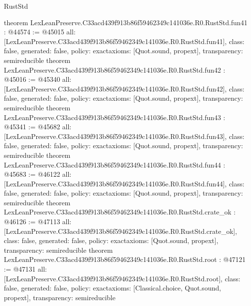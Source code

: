 \begin{lexlean}{RustStd}
\begin{coremodule}
{}
theorem LexLeanPreserve.C33acd439f913b86f59462349c141036e.R0.RustStd.fun41 : @44574 := @45015 {
  all: [LexLeanPreserve.C33acd439f913b86f59462349c141036e.R0.RustStd.fun41],
  class: false,
  generated: false,
  policy: exact{axioms: [Quot.sound, propext]},
  transparency: semireducible
}
theorem LexLeanPreserve.C33acd439f913b86f59462349c141036e.R0.RustStd.fun42 : @45016 := @45340 {
  all: [LexLeanPreserve.C33acd439f913b86f59462349c141036e.R0.RustStd.fun42],
  class: false,
  generated: false,
  policy: exact{axioms: [Quot.sound, propext]},
  transparency: semireducible
}
theorem LexLeanPreserve.C33acd439f913b86f59462349c141036e.R0.RustStd.fun43 : @45341 := @45682 {
  all: [LexLeanPreserve.C33acd439f913b86f59462349c141036e.R0.RustStd.fun43],
  class: false,
  generated: false,
  policy: exact{axioms: [Quot.sound, propext]},
  transparency: semireducible
}
theorem LexLeanPreserve.C33acd439f913b86f59462349c141036e.R0.RustStd.fun44 : @45683 := @46122 {
  all: [LexLeanPreserve.C33acd439f913b86f59462349c141036e.R0.RustStd.fun44],
  class: false,
  generated: false,
  policy: exact{axioms: [Quot.sound, propext]},
  transparency: semireducible
}
theorem LexLeanPreserve.C33acd439f913b86f59462349c141036e.R0.RustStd.crate_ok : @46126 := @47113 {
  all: [LexLeanPreserve.C33acd439f913b86f59462349c141036e.R0.RustStd.crate_ok],
  class: false,
  generated: false,
  policy: exact{axioms: [Quot.sound, propext]},
  transparency: semireducible
}
theorem LexLeanPreserve.C33acd439f913b86f59462349c141036e.R0.RustStd.root : @47121 := @47131 {
  all: [LexLeanPreserve.C33acd439f913b86f59462349c141036e.R0.RustStd.root],
  class: false,
  generated: false,
  policy: exact{axioms: [Classical.choice, Quot.sound, propext]},
  transparency: semireducible
}


\end{coremodule}
\end{lexlean}
